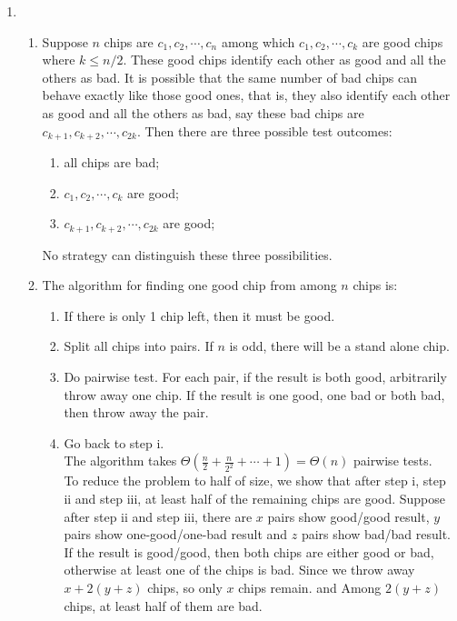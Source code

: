 \documentclass[11pt]{article}
\begin{document}
\begin{enumerate}
\item %
\begin{enumerate}
\item Suppose $n$ chips are $c_1,c_2,\cdots,c_n$ among which
  $c_1,c_2,\cdots,c_k$ are good chips where $k \leq n/2$. These good
  chips identify each other as good and all the others as bad. It is
  possible that the same number of bad chips can behave exactly like
  those good ones, that is, they also identify each other as good and
  all the others as bad, say these bad chips are
  $c_{k+1},c_{k+2},\cdots,c_{2k}$. Then there are three possible test
  outcomes:
\begin{enumerate}
\item all chips are bad;
\item $c_1,c_2,\cdots,c_k$ are good;
\item $c_{k+1},c_{k+2},\cdots,c_{2k}$ are good;
\end{enumerate}

No strategy can distinguish these three possibilities.

\item The algorithm for finding one good chip from among $n$ chips is:
\begin{enumerate}
\item If there is only 1 chip left, then it must be good.
\item Split all chips into pairs. If $n$ is odd, there will be a stand
  alone chip.
\item Do pairwise test. For each pair, if the result is both good,
  arbitrarily throw away one chip. If the result is one good, one bad
  or both bad, then throw away the pair. 
\item Go back to step i.\\

The algorithm takes
$\Theta(\frac{n}{2}+\frac{n}{2^2}+\cdots+1)=\Theta(n)$ pairwise tests.\\

To reduce the problem to half of size, we show that after step i, step
ii and step iii, at least half of the remaining chips are
good. Suppose after step ii and step iii, there are $x$ pairs show
good/good result, $y$ pairs show one-good/one-bad result and $z$ pairs
show bad/bad result. If the result is good/good, then both chips are
either good or bad, otherwise at least one of the chips is bad.
Since we throw away $x+2(y+z)$ chips, so only $x$ chips remain. and
Among $2(y+z)$ chips, at least half of them are bad.\\


\end{enumerate}
\end{enumerate}
\end{enumerate}
\end{document}
